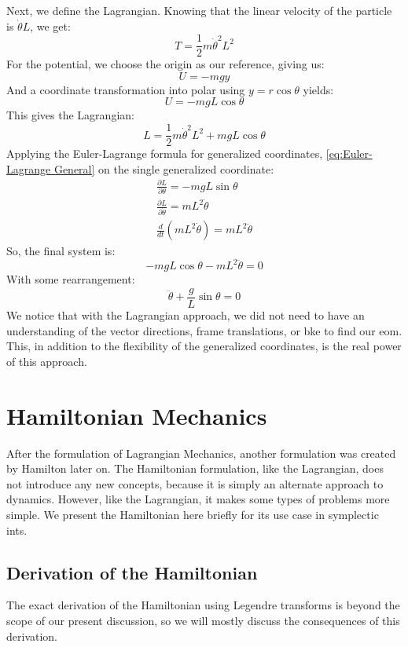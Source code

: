 \documentclass[12pt]{report}
\begin{document}
Next, we define the \gls{Lagrangian}. Knowing that the linear velocity of the particle is $\dot{\theta}L$, we get:
$$T=\frac{1}{2}m\dot{\theta}^2L^2$$
For the potential, we choose the origin as our reference, giving us:
$$U=-mgy$$
And a coordinate transformation into polar using $y=r\cos\theta$ yields:
$$U=-mgL\cos\theta$$
This gives the \gls{Lagrangian}:
$$L=\frac{1}{2}m\dot{\theta}^2L^2+mgL\cos\theta$$
Applying the Euler-Lagrange formula for generalized coordinates, \eqref{eq:Euler-Lagrange General} on the single generalized coordinate:
\begin{gather}
    \frac{\partial L}{\partial \theta}=-mgL\sin\theta\\
    \frac{\partial L}{\partial \dot{\theta}}=mL^2\dot{\theta}\\
    \frac{d}{dt}\left(mL^2\dot{\theta}\right)=mL^2\ddot{\theta}
\end{gather}
So, the final system is:
$$-mgL\cos\theta -mL^2\ddot{\theta}=0$$
With some rearrangement:
$$\ddot{\theta}+\frac{g}{L}\sin\theta=0$$
We notice that with the \gls{Lagrangian} approach, we did not need to have an understanding of the vector directions, frame translations, or \gls{bke} to find our \gls{eom}. This, in addition to the flexibility of the generalized coordinates, is the real power of this approach.


\section{Hamiltonian Mechanics}\label{sec:hamiltonian}
After the formulation of \gls{Lagrangian} Mechanics, another formulation was created by Hamilton later on. The Hamiltonian formulation, like the \gls{Lagrangian}, does not introduce any new concepts, because it is simply an alternate approach to dynamics. However, like the \gls{Lagrangian}, it makes some types of problems more simple. We present the Hamiltonian here briefly for its use case in \glspl{symplectic int}.
\subsection{Derivation of the Hamiltonian}
The exact derivation of the Hamiltonian using Legendre transforms is beyond the scope of our present discussion, so we will mostly discuss the consequences of this derivation. 
\end{document}
